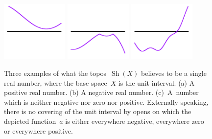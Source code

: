 \documentclass[graybox]{svmult}
\DeclareMathOperator{\Sh}{Sh}
\renewcommand{\_}{\mathpunct{.}\,}
\newcommand{\?}{\,{:}\,}
\begin{document}
\begin{figure}
  \centering
  \includegraphics[height=3cm]{trichotomy-1}
  \includegraphics[height=3cm]{trichotomy-2}
  \includegraphics[height=3cm]{trichotomy-3}
  \caption{\label{fig:trichotomy}Three examples of what the topos~$\Sh(X)$
  believes to be a single real number, where the base space~$X$ is the
  unit interval. (a) A positive real number. (b) A negative real number. (c)~A~number
  which is neither negative nor zero nor positive. Externally speaking,
  there is no covering of the unit interval by opens on which the
  depicted function~$a$ is either everywhere negative, everywhere zero or everywhere
  positive.}
\end{figure}
\end{document}
